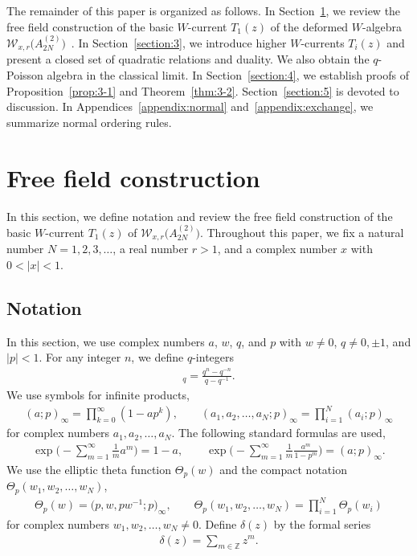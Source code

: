 \documentclass[pdftex]{sigma}
\numberwithin{equation}{section}
\begin{document}
The remainder of this paper is organized as follows.
In Section~\ref{section:2}, we review
the free field construction of the basic $W$-current $T_1(z)$ of
the deformed $W$-algebra ${\mathcal W}_{x,r}\bigl(A_{2N}^{(2)}\bigr)$~\cite{Frenkel-Reshetikhin1}.
In Section~\ref{section:3},
we introduce higher $W$-currents $T_i(z)$ and present a closed set of quadratic relations and duality.
We also obtain the $q$-Poisson algebra in the classical limit.
In Section~\ref{section:4}, we establish
proofs of Proposition~\ref{prop:3-1} and Theorem~\ref{thm:3-2}.
Section~\ref{section:5} is devoted to discussion.
In Appendices~\ref{appendix:normal} and~\ref{appendix:exchange},
we summarize normal ordering rules.

\section{Free field construction}
\label{section:2}

In this section, we define notation and review the free field construction
of the basic $W$-current $T_1(z)$ of ${\mathcal W}_{x,r}\bigl(A_{2N}^{(2)}\bigr)$.
Throughout this paper, we fix a natural number $N=1,2,3,\dots$,
a real number $r>1$, and a complex number $x$ with $0<|x|<1$.

\subsection{Notation}

In this section, we use complex numbers $a$, $w$, $q$, and $p$
with $w\neq 0$, $q \neq 0,\pm1$, and $|p|<1$. For any integer $n$, we define $q$-integers
\begin{gather*}
[n]_q=\frac{q^n-q^{-n}}{q-q^{-1}}.
\end{gather*}
We {use} symbols for infinite products,
\begin{gather*}
(a;p)_\infty=\prod_{k=0}^\infty (1-a p^k),\qquad
(a_1,a_2, \dots, a_N; p)_\infty=\prod_{i=1}^N (a_i; p)_\infty
\end{gather*}
for complex numbers $a_1, a_2, \dots, a_N$.
The following standard formulas are used,
\begin{gather*}
\exp\Biggl({-}\sum_{m=1}^\infty \frac{1}{m}a^m \Biggr)=1-a,\qquad
\exp\Biggl({-}\sum_{m=1}^\infty \frac{1}{m}\frac{a^m}{1-p^m}\Biggr)=(a;p)_\infty.
\end{gather*}
We use the elliptic theta function $\Theta_p(w)$ and the compact notation $\Theta_p(w_1,w_2, \dots, w_N)$,
\begin{gather*}
\Theta_p(w)=\big(p, w, p w^{-1};p\big)_\infty,\qquad
\Theta_p (w_1, w_2, \dots, w_N)=\prod_{i=1}^N \Theta_p(w_i)
\end{gather*}
for complex numbers $w_1, w_2, \dots, w_N \neq 0$. Define
$\delta(z)$ by the formal series
\begin{gather*}
\delta(z)=\sum_{m \in \mathbb{Z}}z^m.
\end{gather*}
\end{document}
